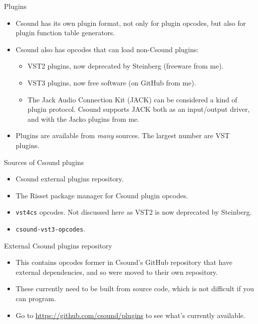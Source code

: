 \documentclass{beamer}
\begin{document}
\begin{frame}{Plugins}
\begin{itemize}
\item Csound has its own plugin format, not only for plugin opcodes, but also for plugin function table generators.
\item Csound also has opcodes that can load non-Csound plugins:
\begin{itemize}
\item VST2 plugins, now deprecated by Steinberg (freeware from me).
\item VST3 plugins, now free software (on GitHub from me).
\item The Jack Audio Connection Kit (JACK) can be considered a kind of plugin protocol. Csound supports JACK both as an input/output driver, and with the Jacko plugins from me.
\end{itemize}
\item Plugins are available from \emph{many} sources. The largest number are VST plugins.
\end{itemize}
\end{frame}

\begin{frame}{Sources of Csound plugins}
\begin{itemize}
\item Csound external plugins repository.
\item The Risset package manager for Csound plugin opcodes.
\item \texttt{vst4cs} opcodes. Not discussed here as VST2 is now deprecated by Steinberg.
\item \texttt{csound-vst3-opcodes}.
\end{itemize}
\end{frame}

\begin{frame}{External Csound plugins repository}
\begin{itemize}
\item This contains opcodes former in Csound's GitHub repository that have external dependencies, and so were moved to their own repository.
\item These currently need to be built from source code, which is not difficult if you can program.
\item Go to \url{https://github.com/csound/plugins} to see what's currently available.
\end{itemize}
\end{frame}
\end{document}

